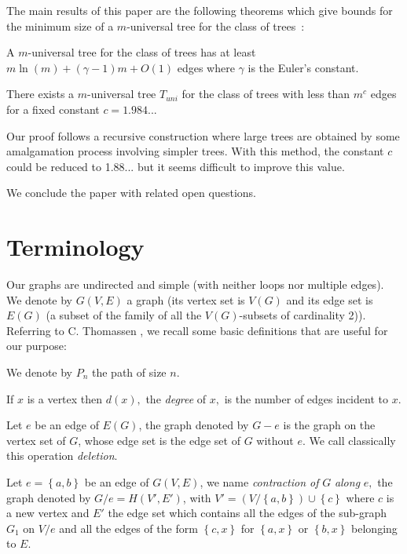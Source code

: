 \documentclass{llncs}
\begin{document}
The main results of this paper are the following theorems which
give bounds for the minimum size of a $m$-universal tree for the
class of trees~:





\begin{theorem}\label{th1} A $m$-universal tree for the class of trees has
at least $m\ln (m) + (\gamma - 1)m + O(1)$ edges where $\gamma$ is
the Euler's constant.
\end{theorem}


\begin{theorem} \label{th2} There exists a $m$-universal tree $T_{uni} $ for the
class of trees with less than $m^c$ edges for a fixed constant $c
= 1.984...$
\end{theorem}
Our proof follows a recursive
construction where large trees are obtained by some amalgamation
process involving simpler trees. With this method, the constant
$c$ could be reduced to 1.88... but it seems difficult to improve
this value.





We conclude the paper with related open questions.





\section{Terminology}





Our graphs are undirected and simple (with neither loops nor
multiple edges). We denote by $G(V,E)$ a graph (its vertex set is
$V(G)$ and its edge set is $E(G)$ (a subset of the family of all
the $V(G)$-subsets of cardinality 2)). Referring to C. Thomassen
\cite{Th}, we recall some basic definitions that are useful for
our purpose:

We denote by $P_n $ the path of size $n.$

If $x$ is a vertex then $d(x),$ the \textit{degree} of $x,$ is the number of edges incident to
$x.$

Let $e$ be an edge of $E(G)$, the graph denoted by $G - e$ is the
graph on the vertex set of $G$, whose edge set is the edge set of
$G$ without $e$. We call classically this operation
\textit{deletion}.

Let $e = \left\{ {a,b} \right\}$ be an edge of $G(V,E)$, we name
\textit{contraction of }$G$\textit{ along }$e,$ the graph denoted by $G / e = H(V',E')$, with ${V}' = \left( {V /
\left\{ {a,b} \right\}} \right) \cup \left\{ c \right\}$ where $c$ is a new
vertex and $E'$ the edge set which contains all the edges of the sub-graph
$G_1 $ on $V / e$ and all the edges of the form $\left\{ {c,x} \right\}$ for
$\left\{ {a,x} \right\}$ or $\left\{ {b,x} \right\}$ belonging to $E$.
\end{document}
